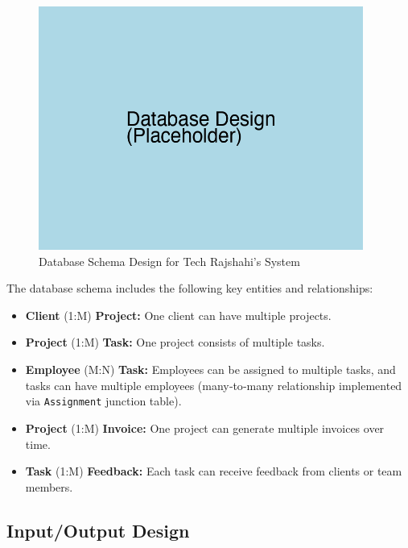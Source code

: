\documentclass[12pt,a4paper]{article}
\begin{document}
\begin{figure}[H]
    \centering
    \includegraphics[width=0.95\textwidth]{Fig/database_design.png}
    \caption{Database Schema Design for Tech Rajshahi's System}
    \label{fig:database_design}
\end{figure}

The database schema includes the following key entities and relationships:
\begin{itemize}
    \item \textbf{Client} (1:M) \textbf{Project:} One client can have multiple projects.
    \item \textbf{Project} (1:M) \textbf{Task:} One project consists of multiple tasks.
    \item \textbf{Employee} (M:N) \textbf{Task:} Employees can be assigned to multiple tasks, and tasks can have multiple employees (many‑to‑many relationship implemented via \texttt{Assignment} junction table).
    \item \textbf{Project} (1:M) \textbf{Invoice:} One project can generate multiple invoices over time.
    \item \textbf{Task} (1:M) \textbf{Feedback:} Each task can receive feedback from clients or team members.
\end{itemize}

\subsection{Input/Output Design}
\end{document}
